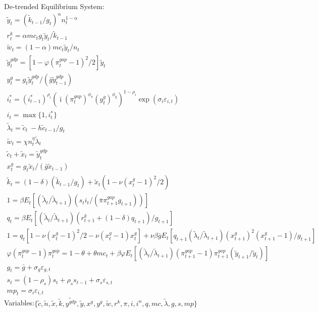 \documentclass[12pt, final]{article}
\begin{document}
\setcounter{equation}{0}
\noindent De-trended Equilibrium System:
\small\begin{gather}
\tilde{y}_t= (\tilde{k}_{t-1}/g_t)^\alpha n_t^{1-\alpha}\\
r^k_t = \alpha mc_t g_t \tilde{y}_t/\tilde{k}_{t-1}\\
\tilde{w}_t = (1-\alpha)mc_t\tilde{y}_t/n_t\\
\tilde{y}^{gdp}_t = [1-\varphi(\pi_t^{gap} - 1)^2/2]\tilde{y}_t\\
y^g_t = g_t\tilde{y}^{gdp}_t/(\bar{g}\tilde{y}^{gdp}_{t-1})\\
i_t^*=(i^*_{t-1})^{\rho_i}(\bar{\imath}(\pi_t^{gap})^{\phi_\pi}(y^g_t)^{\phi_y})^{1-\rho_i}\exp(\sigma_i\varepsilon_{i,t})\\
i_t=\max\{1,i_t^*\}\\
\tilde{\lambda}_t = \tilde{c}_t\ - h\tilde{c}_{t-1}/g_t\\
\tilde{w}_t = \chi n_t^\eta \tilde{\lambda}_t  \\
\tilde{c}_t + \tilde{x}_t = \tilde{y}^{gdp}_t\\
x^g_t = g_t\tilde{x}_t/(\bar{g}\tilde{x}_{t-1})\\
\tilde{k}_t = (1-\delta)(\tilde{k}_{t-1}/g_t) + \tilde{x}_t(1-\nu(x^g_t-1)^2/2)\\%
  1 = \beta E_t[(\tilde{\lambda}_t/\tilde{\lambda}_{t+1})(s_ti_t/(\bar{\pi}\pi_{t+1}^{gap}g_{t+1}))]\\
q_t = \beta E_t[(\tilde{\lambda}_t/\tilde{\lambda}_{t+1})(r^k_{t+1} + (1-\delta)q_{t+1})/g_{t+1}]\\
1 = q_t[1 - \nu(x^g_t-1)^2/2 - \nu(x^g_t-1)x^g_t] + \nu\beta\bar{g}E_t[q_{t+1}(\tilde{\lambda}_t/\tilde{\lambda}_{t+1})(x^g_{t+1})^2(x^g_{t+1}-1)/g_{t+1}]\\
  \varphi(\pi_t^{gap}-1){\pi}_t^{gap} = 1-\theta + \theta mc_t + \beta\varphi E_t[(\tilde{\lambda}_t/\tilde{\lambda}_{t+1}) (\pi_{t+1}^{gap}-1)\pi_{t+1}^{gap}(\tilde{y}_{t+1}/\tilde{y}_t)]\\
  g_t= \bar{g} + \sigma_g\varepsilon_{g,t} \\
  s_t=(1-\rho_s)s_t+\rho_ss_{t-1} + \sigma_s\varepsilon_{s,t}\\
  mp_t = \sigma_i\varepsilon_{i,t}
\end{gather}
Variables:$\{\tilde{c},\tilde{n},\tilde{x},\tilde{k},\tilde{y^{gdp}},\tilde{y},x^g,y^g,\tilde{w},r^k,\pi,i,i^n,q,mc,\tilde{\lambda},g,s,mp\}$\\
\end{document}
